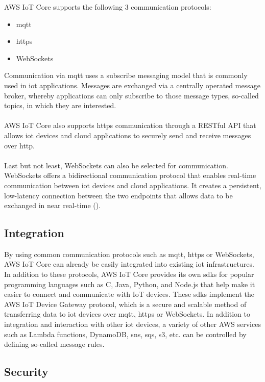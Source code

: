 AWS IoT Core supports the following 3 communication protocols:

\begin{itemize}
    \item \ac{mqtt}
    \item \ac{https}
    \item WebSockets
\end{itemize}
Communication via \ac{mqtt} uses a subscribe messaging model that is commonly used in \ac{iot} applications. 
Messages are exchanged via a centrally operated message broker, whereby applications can only subscribe to those message types, so-called topics, in which they are interested.
\\
\\
AWS IoT Core also supports \ac{https} communication through a RESTful API that allows \ac{iot} devices and cloud applications to securely send and receive messages over \ac{http}.
\\
\\
Last but not least, WebSockets can also be selected for communication. WebSockets offers a bidirectional communication protocol that enables real-time communication between \ac{iot} devices and cloud applications. 
It creates a persistent, low-latency connection between the two endpoints that allows data to be exchanged in near real-time ({\cite{ref02}}).

\subsection{Integration}

By using common communication protocols such as \ac{mqtt}, \ac{https} or WebSockets, AWS IoT Core can already be easily integrated into existing \ac{iot} infrastructures. 
In addition to these protocols, AWS IoT Core provides its own \ac{sdk}s for popular programming languages such as C, Java, Python, and Node.js that help make it easier to connect and communicate with IoT devices. 
These \ac{sdk}s implement the AWS IoT Device Gateway protocol, which is a secure and scalable method of transferring data to \ac{iot} devices over \ac{mqtt}, \ac{https} or WebSockets.
In addition to integration and interaction with other \ac{iot} devices, a variety of other AWS services such as Lambda functions, DynamoDB, \ac{sns}, \ac{sqs}, \ac{s3}, etc. can be controlled by defining so-called message rules.

\subsection{Security}

